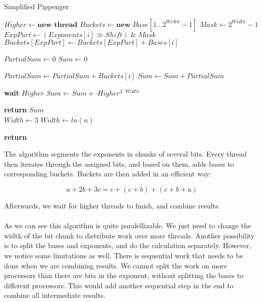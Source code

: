 \begin{algorithm}[h]
\caption{Simplified Pippenger}\label{fig:multiexp}
\begin{algorithmic}[1]

        \State $Higher \gets \textbf{new thread}$ 
    \EndIf
    \State $Buckets \gets \textbf{new} \; Base[1\dots2^{Width}-1]$
    \State $Mask \gets 2^{Width}-1$
        \State $ExpPart \gets (Exponents[i] \gg Shift) \; \&  \;Mask$
            \State $Buckets[ExpPart] \gets Buckets[ExpPart] + Bases[i]$
        \EndIf
    \EndFor
    
    \State $PartialSum \gets 0$
    \State $Sum \gets 0$
    
        \State $PartialSum \gets PartialSum + Buckets[i]$
        \State $Sum \gets Sum + PartialSum$
    \EndFor
    
        \State \textbf{wait} $Higher$
        \State $Sum \gets Sum + \cdot Higher^{2 \cdot Width}$ 
    \EndIf
    
    \State \textbf{return} $Sum$
\EndFunction
\\
        \State $Width \gets 3$
    \Else
        \State $Width \gets ln(n)$
    \EndIf

    \State \textbf{return} 
    
\EndFunction
\end{algorithmic}
\end{algorithm}

The algorithm segments the exponents in chunks of several bits. Every thread then iterates through the assigned bits, and based on them, adds bases to corresponding buckets. Buckets are then added in an efficient way:

$$ a + 2b + 3c = c + (c + b) + (c + b + a) $$

Afterwards, we wait for higher threads to finish, and combine results.\\
\\
As we can see this algorithm is quite paralellizable. We just need to change the width of the bit chunk to distribute work over more threads. Another possibility is to split the bases and exponents, and do the calculation separately. However, we notice some limitations as well. There is sequential work that needs to be done when we are combining results. We cannot split the work on more processors than there are bits in the exponent, without splitting the bases to different processors. This would add another sequential step in the end to combine all intermediate results.
\\
